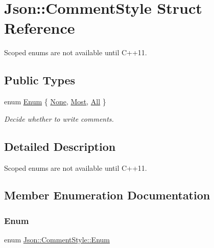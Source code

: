 \hypertarget{structJson_1_1CommentStyle}{}\section{Json\+:\+:Comment\+Style Struct Reference}
\label{structJson_1_1CommentStyle}


Scoped enums are not available until C++11.  


\subsection*{Public Types}
\begin{DoxyCompactItemize}
\item 
enum \hyperlink{structJson_1_1CommentStyle_a51fc08f3518fd81eba12f340d19a3d0c}{Enum} \{ \hyperlink{structJson_1_1CommentStyle_a51fc08f3518fd81eba12f340d19a3d0cac8b32a8bae63414c8647d4919da8d437}{None}, 
\hyperlink{structJson_1_1CommentStyle_a51fc08f3518fd81eba12f340d19a3d0cac65238f050773c107690a456e9c05c98}{Most}, 
\hyperlink{structJson_1_1CommentStyle_a51fc08f3518fd81eba12f340d19a3d0ca32302c0b97190c1808b3e38f367fef01}{All}
 \}\begin{DoxyCompactList}\small\item\em Decide whether to write comments. \end{DoxyCompactList}
\end{DoxyCompactItemize}


\subsection{Detailed Description}
Scoped enums are not available until C++11. 

\subsection{Member Enumeration Documentation}
\mbox{\label{structJson_1_1CommentStyle_a51fc08f3518fd81eba12f340d19a3d0c}} 
\subsubsection{\texorpdfstring{Enum}{Enum}}
{\footnotesize\ttfamily enum \hyperlink{structJson_1_1CommentStyle_a51fc08f3518fd81eba12f340d19a3d0c}{Json\+::\+Comment\+Style\+::\+Enum}}



